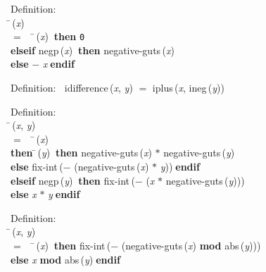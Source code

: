 \begin{tabbing}{\sc Definition}: \\  
\=\,({\it{x\/}}) \\ 
$=$$\;\;\;\;$\=\,({\it{x\/}})$\;\;${\bf then }{\tt{0}} \\ 
{\bf elseif }{\rm{negp}}\,({\it{x\/}})$\;\;${\bf then }{\rm{negative-guts}}\,({\it{x\/}}) \\ 
{\bf else }$-$ {\it{x\/}}$\;${\bf  endif}\-\-
\end{tabbing}

\begin{tabbing}{\sc Definition}:$\;\;$
{\rm{idifference}}\,({\it{x\/}}, {\it{y\/}}) $=$ {\rm{iplus}}\,({\it{x\/}}, {\rm{ineg}}\,({\it{y\/}}))
\end{tabbing}

\begin{tabbing}{\sc Definition}: \\  
\=\,({\it{x\/}}, {\it{y\/}}) \\ 
$=$$\;\;\;\;$\=\,({\it{x\/}}) \\ 
{\bf then }\=\,({\it{y\/}})$\;\;${\bf then }{\rm{negative-guts}}\,({\it{x\/}}) $*$ {\rm{negative-guts}}\,({\it{y\/}}) \\ 
{\bf else }{\rm{fix-int}}\,($-$ ({\rm{negative-guts}}\,({\it{x\/}}) $*$ {\it{y\/}}))$\;${\bf  endif}\- \\ 
{\bf elseif }{\rm{negp}}\,({\it{y\/}})$\;\;${\bf then }{\rm{fix-int}}\,($-$ ({\it{x\/}} $*$ {\rm{negative-guts}}\,({\it{y\/}}))) \\ 
{\bf else }{\it{x\/}} $*$ {\it{y\/}}$\;${\bf  endif}\-\-
\end{tabbing}

\begin{tabbing}{\sc Definition}: \\  
\=\,({\it{x\/}}, {\it{y\/}}) \\ 
$=$$\;\;\;\;$\=\,({\it{x\/}})$\;\;${\bf then }{\rm{fix-int}}\,($-$ ({\rm{negative-guts}}\,({\it{x\/}}) ${}${\bf{mod}}${}$ {\rm{abs}}\,({\it{y\/}}))) \\ 
{\bf else }{\it{x\/}} ${}${\bf{mod}}${}$ {\rm{abs}}\,({\it{y\/}})$\;${\bf  endif}\-\-
\end{tabbing}


